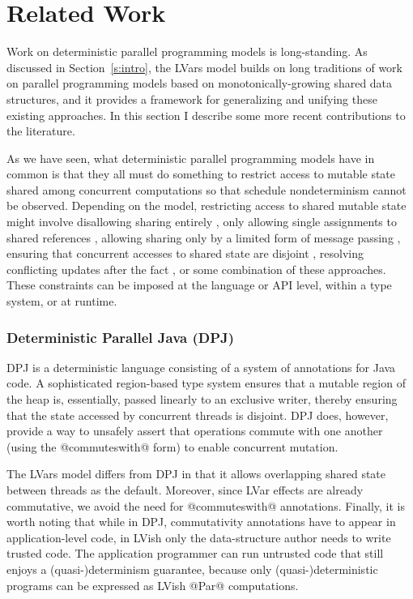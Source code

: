 \chapter{Related Work\label{ch:related}} %



Work on deterministic parallel programming models is long-standing.
As discussed in Section~\ref{s:intro}, the LVars model builds on long
traditions of work on parallel programming models based on
monotonically-growing shared data structures, and it provides a
framework for generalizing and unifying these existing approaches.  In
this section I describe some more recent contributions to the
literature.

As we have seen, what deterministic parallel programming models have
in common is that they all must do something to restrict access to
mutable state shared among concurrent computations so that schedule
nondeterminism cannot be observed.  Depending on the model,
restricting access to shared mutable state might involve disallowing
sharing entirely \cite{dph}, only allowing single assignments to
shared references \cite{Tesler-1968, IStructures, CnC}, allowing
sharing only by a limited form of message passing \cite{Kahn-1974},
ensuring that concurrent accesses to shared state are disjoint
\cite{dpj-oopsla}, resolving conflicting updates after the fact
\cite{concurrent-revisions-haskell11}, or some combination of these
approaches.  These constraints can be imposed at the language or API
level, within a type system, or at runtime.

\subsection{Deterministic Parallel Java (DPJ)}

DPJ \cite{dpj-oopsla, dpj-hotpar09} is a deterministic language
consisting of a system of annotations for Java code.  A sophisticated
region-based type system ensures that a mutable region of the heap is,
essentially, passed linearly to an exclusive writer, thereby ensuring
that the state accessed by concurrent threads is disjoint.  DPJ does,
however, provide a way to unsafely assert that operations commute with
one another (using the @commuteswith@ form) to enable concurrent
mutation.

The LVars model differs from DPJ in that it allows overlapping shared
state between threads as the default.  Moreover, since LVar effects
are already commutative, we avoid the need for @commuteswith@
annotations.  Finally, it is worth noting that while in DPJ,
commutativity annotations have to appear in application-level code, in
LVish only the data-structure author needs to write trusted code. The
application programmer can run untrusted code that still enjoys a
(quasi-)determinism guarantee, because only (quasi-)deterministic
programs can be expressed as LVish @Par@ computations.

